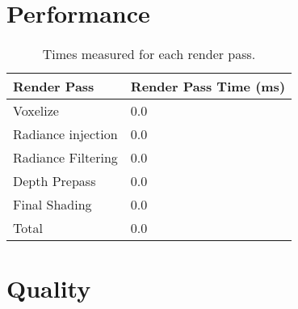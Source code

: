 \section{Performance}

\begin{table}[H]
\centering
\begin{tabular}{ll}
\toprule
Render Pass & Render Pass Time (ms) \\
\midrule
Voxelize                & 0.0\\
Radiance injection      & 0.0\\
Radiance Filtering      & 0.0\\
Depth Prepass           & 0.0\\
Final Shading           & 0.0\\
\midrule
Total                   & 0.0\\
\bottomrule
\end{tabular}
\caption{Times measured for each render pass.}
\label{tbl:renderpasstiming}
\end{table}




\section{Quality}

